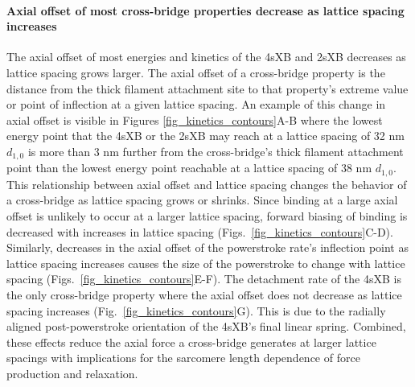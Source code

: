 \documentclass[]{article}
\begin{document}
\paragraph{Axial offset of most cross-bridge properties decrease as lattice spacing increases} %
The axial offset of most energies and kinetics of the 4sXB and 2sXB decreases as lattice spacing grows larger.
The axial offset of a cross-bridge property is the distance from the thick filament attachment site to that property's extreme value or point of inflection at a given lattice spacing. 
An example of this change in axial offset is visible in Figures \ref{fig_kinetics_contours}A-B where the lowest energy point that the 4sXB or the 2sXB may reach at a lattice spacing of 32 nm $d_{1,0}$ is more than 3 nm further from the cross-bridge's thick filament attachment point than the lowest energy point reachable at a lattice spacing of 38 nm $d_{1,0}$.
This relationship between axial offset and lattice spacing changes the behavior of a cross-bridge as lattice spacing grows or shrinks.
Since binding at a large axial offset is unlikely to occur at a larger lattice spacing, forward biasing of binding is decreased with increases in lattice spacing (Figs.~\ref{fig_kinetics_contours}C-D). 
Similarly, decreases in the axial offset of the powerstroke rate's inflection point as lattice spacing increases causes the size of the powerstroke to change with lattice spacing (Figs.~\ref{fig_kinetics_contours}E-F).
The detachment rate of the 4sXB is the only cross-bridge property where the axial offset does not decrease as lattice spacing increases (Fig.~\ref{fig_kinetics_contours}G).
This is due to the radially aligned post-powerstroke orientation of the 4sXB's final linear spring. 
Combined, these effects reduce the axial force a cross-bridge generates at larger lattice spacings with implications for the sarcomere length dependence of force production and relaxation. 
\end{document}
